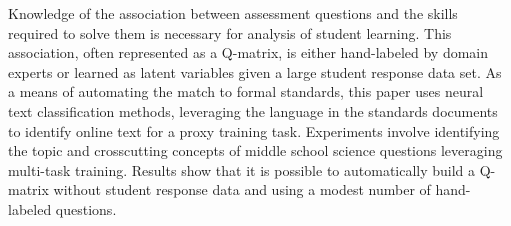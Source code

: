 Knowledge of the association between assessment questions and the skills required to solve them is necessary for analysis of student learning. This association, often represented as a Q-matrix, is either hand-labeled by domain experts or learned as latent variables given a large student response data set. As a means of automating the match to formal standards, this paper uses neural text classification methods, leveraging the language in the standards documents to identify online text for a proxy training task. Experiments involve identifying the topic and crosscutting concepts of middle school science questions leveraging multi-task training. Results show that it is possible to automatically build a Q-matrix without student response data and using a modest number of hand-labeled questions.
